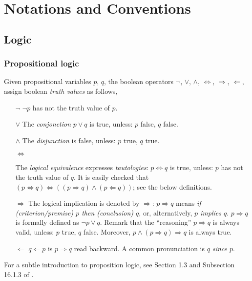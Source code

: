\renewcommand{\thesection}{\Roman{section}}
\renewcommand{\thesubsection}{\roman{subsection}}
%
\chapter{Notations and Conventions}%
\section{Logic}%
\subsection{Propositional logic}
Given propositional variables $\mathit{p}$, $\mathit{q}$, the boolean %
operators $\lnot$, $\lor$, $\land$, $\Leftrightarrow$, $\Rightarrow$, %
$\Leftarrow$, assign boolean \textit{truth values} as follows,
\begin{enumerate}
  \item[$\lnot$]{%
    $\lnot p$ has not the truth value of $p$.
  }
  \item[$\lor$]{
    The \textit{conjonction} $p \lor q$ is true, unless: %
    $p$ false, $q$ false.
  }
  \item[$\land$]{
    The \textit{disjunction} is false, unless: $p$ true, $q$ true.
  }
  \item[$\Leftrightarrow$]{%
    The \textit{logical equivalence} expresses \textit{tautologies}: %
    $p \Leftrightarrow q$ is true, unless: %
    $p$ has not the truth value of $q$. %
    It is easily checked that %
      $(p \Leftrightarrow q) \Leftrightarrow %
        \left(
          (p \Rightarrow q) \land 
          (p \Leftarrow  q)
        \right)$; see the below definitions.
    
  }
  \item[$\Rightarrow$]{%
    The logical implication is denoted by $\Rightarrow$: %
    $p \Rightarrow q$ means %
    \textit{if (criterion/premise) $p$ then (conclusion) $q$}, or, %
    alternatively, \textit{$p$ implies $q$}. %
    $p \Rightarrow q $ is formally defined as $\lnot p \lor q$. %
    Remark that the ``reasoning'' $p \Rightarrow q $ is always valid, unless: %
    $p$ true, $q$ false. Moreover, %
      $p \land (p \Rightarrow q) \Rightarrow q$ %
    is always true.
    }
    \item[$\Leftarrow$]{ $q \Leftarrow p$ is $ p\Rightarrow q $ read backward. 
    A common pronunciation is \textit{$q$ since $p$}.
    }
\end{enumerate}
%
For a subtle introduction to proposition logic, %
see Section 1.3 and Subsection 16.1.3 of \cite{SpecifyingSystems}.
%
